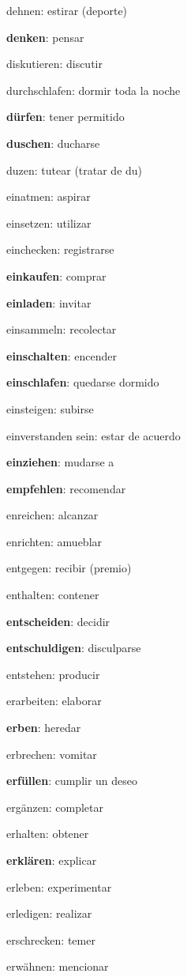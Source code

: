 \begin{multicols}{2}
\begin{myitemize}
\item dehnen: estirar (deporte)
\item \textbf{denken}: pensar
\item diskutieren: discutir
\item durchschlafen: dormir toda la noche
\item \textbf{dürfen}: tener permitido
\item \textbf{duschen}: ducharse
\item duzen: tutear (tratar de du)
\item einatmen: aspirar
\item einsetzen: utilizar
\item einchecken: registrarse
\item \textbf{einkaufen}: comprar
\item \textbf{einladen}: invitar
\item einsammeln: recolectar
\item \textbf{einschalten}: encender
\item \textbf{einschlafen}: quedarse dormido
\item einsteigen: subirse
\item einverstanden sein: estar de acuerdo
\item \textbf{einziehen}: mudarse a
\item \textbf{empfehlen}: recomendar
\item enreichen: alcanzar
\item enrichten: amueblar
\item entgegen: recibir (premio)
\item enthalten: contener
\item \textbf{entscheiden}: decidir
\item \textbf{entschuldigen}: disculparse
\item entstehen: producir
\item erarbeiten: elaborar
\item \textbf{erben}: heredar
\item erbrechen: vomitar
\item \textbf{erfüllen}: cumplir un deseo
\item ergänzen: completar
\item erhalten: obtener
\item \textbf{erklären}: explicar
\item erleben: experimentar
\item erledigen: realizar
\item erschrecken: temer
\item erwähnen: mencionar

\end{myitemize}
\end{multicols}
